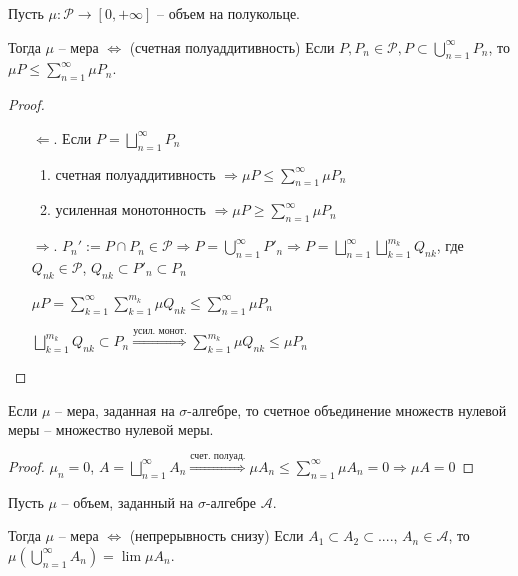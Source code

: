 \begin{theorem}
    Пусть $\mu: \mathcal{P} \rightarrow [0, +\infty]$ – объем на полукольце. 
    
    Тогда $\mu $ – мера $\Leftrightarrow$ (счетная полуаддитивность) Если $P, P_n\in \mathcal{P}, P \subset\bigcup\limits_{n=1}^\infty P_n$, 
    то $\mu P \leq \sum\limits_{n=1}^\infty \mu P_n$.
\end{theorem}

\begin{proof}~
    \begin{enumerate}
        \item[$\Leftarrow$.] Если $P=\bigsqcup\limits_{n=1}^\infty P_n$
            \begin{enumerate}
                \item счетная полуаддитивность $\Rightarrow \mu P \leq \sum\limits_{n=1}^\infty \mu P_n$
                \item усиленная монотонность $\Rightarrow \mu P \geq \sum\limits_{n=1}^\infty \mu P_n$
            \end{enumerate}
        \item[$\Rightarrow$.] $P_n':= P \cap P_n \in \mathcal{P} \Rightarrow P = \bigcup\limits_{n=1}^\infty P'_n\Rightarrow 
        P = \bigsqcup\limits_{n=1}^\infty\bigsqcup\limits_{k=1}^{m_k}Q_{nk}$, где $Q_{nk}\in \mathcal{P}$, $Q_{nk} \subset P'_n \subset P_n$

        $\mu P = \sum\limits_{k=1}^\infty \sum\limits_{k=1}^{m_k} \mu Q_{nk} \leq \sum \limits_{n=1}^\infty \mu P_n$

        $\bigsqcup\limits_{k=1}^{m_k} Q_{nk}\subset P_n\overset{\text{усил. монот.}}{\Rightarrow}\sum\limits_{k=1}^{m_k}\mu Q_{nk}\leq \mu P_n$
    \end{enumerate}
\end{proof}

\begin{corollary}
     Если $\mu$ – мера, заданная на $\sigma$-алгебре, то счетное объединение
     множеств нулевой меры – множество нулевой меры.
\end{corollary}

\begin{proof}
    $\mu _n = 0$, $A=\bigsqcup\limits_{n=1}^\infty A_n\overset{\text{счет. полуад.}}{\Rightarrow} \mu A_n \leq \sum\limits_{n=1}^\infty \mu A_n=0\Rightarrow \mu A=0$
\end{proof}

\begin{theorem}
    Пусть $\mu$ – объем, заданный на $\sigma$-алгебре $\mathcal{A}$. 
    
    Тогда $\mu$ – мера $\Leftrightarrow$ (непрерывность снизу) Если $A_1 \subset A_2 \subset ....$, $A_n\in \mathcal{A}$,
    то $\mu (\bigcup\limits_{n=1}^\infty A_n) =\lim \mu A_n$.
\end{theorem}

